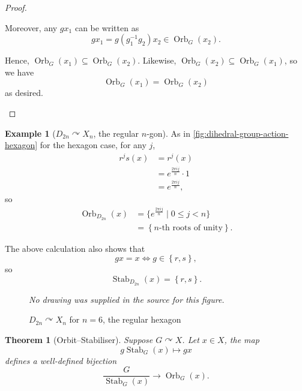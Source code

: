 \documentclass{article}
\newtheorem{theorem}{Theorem}[section]
\theoremstyle{definition}
\newtheorem*{example*}{Example}
\theoremstyle{remark}
\newcommand{\pqty}[1]{\left(#1\right)}
\newcommand{\Bqty}[1]{\left\{#1\right\}}
\newcommand{\set}[2]{\{#1\mid #2\}}
\newcommand{\flatfrac}[2]{\frac{#1}{#2}}
\newcommand{\inverse}{^{-1}}
\newcommand{\actson}{\curvearrowright}
\newcommand{\Stab}{\operatorname{Stab}}
\newcommand{\Orb}{\operatorname{Orb}}
\begin{document}
\begin{proof}
\begin{enumerate}
\begin{itemize}
            Moreover, any \(g x_1\) can be written as
            \[
                g x_1 = g \pqty{g_1\inverse g_2} x_2 \in \Orb_{G} \pqty{x_2}.
            \]

            Hence, \(\Orb_{G} \pqty{x_1} \subseteq \Orb_{G} \pqty{x_2}\). Likewise, \(\Orb_{G} \pqty{x_2} \subseteq \Orb_{G} \pqty{x_1}\), so we have
            \[
                \Orb_{G} \pqty{x_1} = \Orb_{G} \pqty{x_2}
            \]
            as desired.
        \end{itemize}
    \end{enumerate}
\end{proof}

\begin{example*}[\(D_{2n} \actson X_n\), the regular \(n\)-gon]
    As in \autoref{fig:dihedral-group-action-hexagon} for the hexagon case, for any \(j\),
    \begin{align*}
        r^j s \pqty{x} &= r^j \pqty{x} \\
        &= e^{\frac{2 \pi i j}{n}} \cdot 1 \\
        &= e^{\frac{2 \pi i j}{n}},
    \end{align*}
    so
    \begin{align*}
        \Orb_{D_{2n}}\pqty{x} &= \set{e^{\frac{2 \pi i j}{n}}}{0 \leq j < n} \\
        &= \Bqty{n\text{-th roots of unity}}.
    \end{align*}

    The above calculation also shows that
    \[
        gx = x \iff g \in \Bqty{r, s},
    \]
    so
    \[
        \Stab_{D_{2n}}\pqty{x} = \Bqty{r, s}.
    \]
\end{example*}

\begin{figure}[ht!]
    \centering
    \emph{No drawing was supplied in the source for this figure.}\par
\caption{\(D_{2n} \actson X_n\) for \(n = 6\), the regular hexagon}
    \label{fig:dihedral-group-action-hexagon}
\end{figure}

\begin{theorem}[Orbit--Stabiliser]
    \label{thm:orbit-stabiliser}%
    Suppose \(G \actson X\). Let \(x \in X\), the map
    \[
        g \Stab_{G}\pqty{x} \mapsto gx
    \]
    defines a well-defined bijection
    \[
        \flatfrac{G}{\Stab_{G}\pqty{x}} \to \Orb_{G}\pqty{x}.
    \]
\end{theorem}
\end{document}
